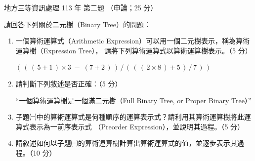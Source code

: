 \begin{pastexam}[label={px:df3-113-ds-02}]{地方三等資訊處理 113 年 第二題}
（申論；25 分）

請回答下列關於二元樹（Binary Tree）的問題：
\begin{enumerate}[leftmargin=2.6em, labelsep=0.4em]
\item[㈠] 一個算術運算式（Arithmetic Expression）可以用一個二元樹表示，稱為算術運算樹（Expression Tree），
請將下列算術運算式以算術運算樹表示。（5 分）

$(\,(\,(\,5 + 1\,) \times 3 \;-\; (7 + 2\,)\,)\,/\,(\,(\,(\,2 \times 8\,) + 5\,)\,/\,7\,)\,)$
\item[㈡] 請判斷下列敘述是否正確：（5 分）

“一個算術運算樹是一個滿二元樹（Full Binary Tree, or Proper Binary Tree）”
\item[㈢] 子題㈠中的算術運算式是何種順序的運算表示式？請利用其算術運算樹將此運算式表示為一前序表示式
（Preorder Expression），並說明其過程。（5 分）
\item[㈣] 請敘述如何以子題㈠的算術運算樹計算出算術運算式的值，並逐步表示其過程。（10 分）
\end{enumerate}
\end{pastexam}

